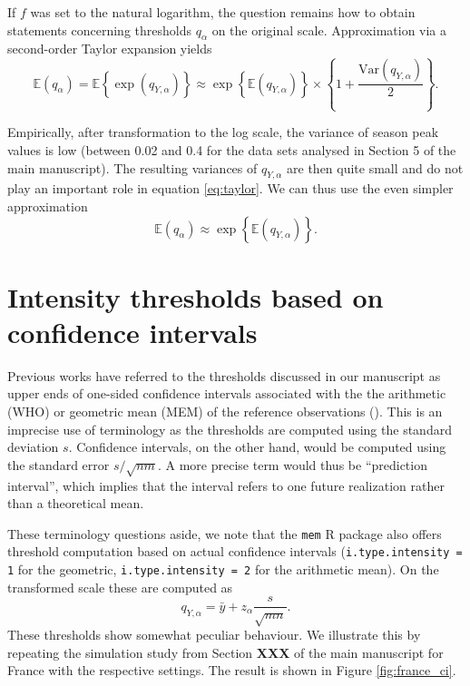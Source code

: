 \documentclass{article}
\newcommand{\sd}{s}
\begin{document}
If $f$ was set to the natural logarithm, the question remains how to obtain statements concerning thresholds $q_\alpha$ on the original scale. Approximation via a second-order Taylor expansion yields
\begin{equation}
\mathbb{E}(q_\alpha) = \mathbb{E}\left\{\exp(q_{Y, \alpha})\right\} \approx \exp\left\{\mathbb{E}(q_{Y, \alpha})\right\} \times \left\{1 + \frac{\text{Var}(q_{Y, \alpha})}{2} \right\}.
\label{eq:taylor}
\end{equation}

Empirically, after transformation to the log scale, the variance of season peak values is low (between 0.02 and 0.4 for the data sets analysed in Section 5 of the main manuscript). The resulting variances of $q_{Y, \alpha}$ are then quite small and do not play an important role in equation \eqref{eq:taylor}. We can thus use the even simpler approximation
\begin{equation}
\mathbb{E}(q_\alpha) \approx \exp\left\{\mathbb{E}(q_{Y, \alpha})\right\}.
\end{equation}

\newpage

\section{Intensity thresholds based on confidence intervals}

Previous works have referred to the thresholds discussed in our manuscript as upper ends of one-sided confidence intervals associated with the the arithmetic (WHO) or geometric mean (MEM) of the reference observations (\citealt{WHO2014, Vega2015}). This is an imprecise use of terminology as the thresholds are computed using the standard deviation $\sd$. Confidence intervals, on the other hand, would be computed using the standard error $\sd/\sqrt{nm}$. A more precise term would thus be ``prediction interval'', which implies that the interval refers to one future realization rather than a theoretical mean.

These terminology questions aside, we note that the \texttt{mem} R package also offers threshold computation based on actual confidence intervals (\texttt{i.type.intensity = 1} for the geometric, \texttt{i.type.intensity = 2} for the arithmetic mean). On the transformed scale these are computed as
\begin{equation}
q_{Y, \alpha} = \bar{y} + z_\alpha \frac{\sd}{\sqrt{mn}}. \label{eq:q_ci}
\end{equation}
These thresholds show somewhat peculiar behaviour. We illustrate this by repeating the simulation study from Section \textbf{XXX} of the main manuscript for France with the respective settings. The result is shown in Figure \ref{fig:france_ci}.
\end{document}
